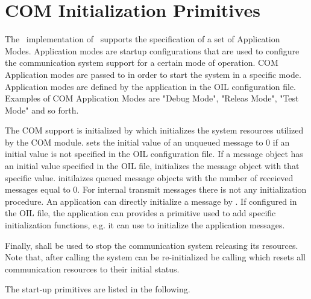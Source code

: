 \pagebreak


\section{COM Initialization Primitives}
The \oc\ implementation of \ee\ supports the specification of a set of {\itCOM 
Application Modes}. Application modes are startup configurations that are used to
configure the communication system support for a certain mode of operation. 
COM Application modes are passed to  in order to start
the system in a specific mode. Application modes are defined by the application in 
the OIL configuration file. Examples of COM Application Modes are "Debug Mode", 
"Releas Mode", "Test Mode" and so forth. 

The COM support is initialized by  which initializes the system 
resources utilized by the COM module.  sets the initial value of 
an unqueued message to 0 if an initial value is not specified in the OIL
configuration file. If a message object has an initial value specified in the OIL
file,  initializes the message object with that specific value.
 initilaizes queued message objects with the number of receieved 
messages equal to 0. For internal transmit messages there is not any initialization 
procedure. An application can directly initialize a message by . If 
configured in the OIL file, the application can provides a  
primitive used to add specific initialization functions, e.g. it can use 
 to initialize the application messages.

Finally,  shall be used to stop the communication system releasing 
its resources. Note that, after calling  the system can be re-initialized 
be calling  which resets all communication resources to their 
initial status. 

The start-up primitives are listed in the following.

\pagebreak

